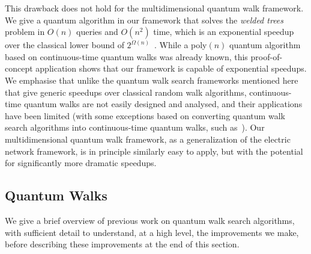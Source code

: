 \documentclass{article}
\renewcommand{\>}{\rangle}
\newcommand{\<}{\langle}
\renewcommand{\(}{\left(}
\renewcommand{\)}{\right)}
\begin{document}
This drawback does not hold for the multidimensional quantum walk framework. We give a quantum algorithm in our framework that solves the \emph{welded trees} problem in $O(n)$ queries and $O(n^2)$ time, which is an exponential speedup over the classical lower bound of $2^{\Omega(n)}$~\cite{childs2003ExpSpeedupQW}. While a poly$(n)$ quantum algorithm based on continuous-time quantum walks was already known, this proof-of-concept application shows that our framework is capable of exponential speedups. We emphasise that unlike the quantum walk search frameworks mentioned here that give generic speedups over classical random walk algorithms, continuous-time quantum walks are not easily designed and analysed, and their applications have been limited (with some exceptions based on converting quantum walk search algorithms into continuous-time quantum walks, such as~\cite{apers2022quadratic}). Our multidimensional quantum walk framework, as a generalization of the electric network framework, is in principle similarly easy to apply, but with the potential for significantly more dramatic speedups. 




\subsection{Quantum Walks}\label{sec:intro-QW}

We give a brief overview of previous work on quantum walk search algorithms, with sufficient detail to understand, at a high level, the improvements we make, before describing these improvements at the end of this section.
\end{document}
